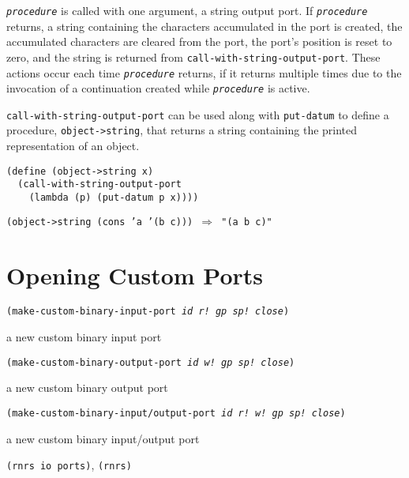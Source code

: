 \texttt{\textit{procedure}} is called with one argument, a string output port.
If \texttt{\textit{procedure}} returns, a string containing the characters accumulated in the port
is created, the accumulated characters are cleared from the port, the port's position is
reset to zero, and the string is returned from \texttt{call-with-string-output-port}.
These actions occur each time \texttt{\textit{procedure}} returns, if it returns
multiple times due to the invocation of a continuation created while
\texttt{\textit{procedure}} is active.

\label{io_s40}\texttt{call-with-string-output-port} can be used along with
\texttt{put-datum} to define a procedure, \texttt{object-\textgreater{}string}, that
returns a string containing the printed representation of an object.


\begin{alltt}
(define (object-\textgreater{}string x)
  (call-with-string-output-port
    (lambda (p) (put-datum p x))))

(object-\textgreater{}string (cons 'a '(b c))) \(\Rightarrow\) "(a b c)"
\end{alltt}

\section{\label{io_g126}\label{io_h5}Opening Custom Ports\label{io_SECTCUSTOMPORTS}}


\begin{description}

\label{io_s41}\item[procedure] \texttt{(make-custom-binary-input-port \textit{id} \textit{r!} \textit{gp} \textit{sp!} \textit{close})}



\item[returns] a new custom binary input port


\item[procedure] \texttt{(make-custom-binary-output-port \textit{id} \textit{w!} \textit{gp} \textit{sp!} \textit{close})}



\item[returns] a new custom binary output port


\item[procedure] \texttt{(make-custom-binary-input/output-port \textit{id} \textit{r!} \textit{w!} \textit{gp} \textit{sp!} \textit{close})}



\item[returns] a new custom binary input/output port


\item[libraries] \texttt{(rnrs io ports)}, \texttt{(rnrs)}
\end{description}


